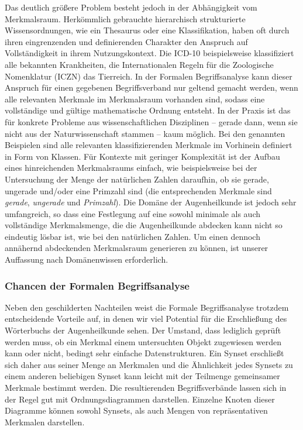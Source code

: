 \documentclass[pagesize,paper=A4,DIV=calc,fontsize=12pt,draft=false]{scrreprt}
\begin{document}
Das deutlich größere Problem besteht jedoch in der Abhängigkeit vom Merkmalsraum. 
Herkömmlich gebrauchte hierarchisch strukturierte Wissensordnungen, wie ein Thesaurus oder eine Klassifikation, haben oft durch ihren eingrenzenden und definierenden Charakter den Anspruch auf Vollständigkeit in ihrem Nutzungskontext. 
Die ICD-10 beispielsweise klassifiziert alle bekannten Krankheiten, die Internationalen Regeln für die Zoologische Nomenklatur (ICZN) das Tierreich. 
In der Formalen Begriffsanalyse kann dieser Anspruch für einen gegebenen Begriffsverband nur geltend gemacht werden, wenn alle relevanten Merkmale im Merkmalsraum vorhanden sind, sodass eine vollständige und gültige mathematische Ordnung entsteht. 
In der Praxis ist das für konkrete Probleme aus wissenschaftlichen Disziplinen -- gerade dann, wenn sie nicht aus der Naturwissenschaft stammen -- kaum möglich. 
Bei den genannten Beispielen sind alle relevanten klassifizierenden Merkmale im Vorhinein definiert in Form von Klassen. 
Für Kontexte mit geringer Komplexität ist der Aufbau eines hinreichenden Merkmalsraums einfach, wie beispielsweise bei der Untersuchung der Menge der natürlichen Zahlen daraufhin, ob sie gerade, ungerade und/oder eine Primzahl sind (die entsprechenden Merkmale sind \textit{gerade}, \textit{ungerade} und \textit{Primzahl}).
Die Domäne der Augenheilkunde ist jedoch sehr umfangreich, so dass eine Festlegung auf eine sowohl minimale als auch vollständige Merkmalsmenge, die die Augenheilkunde abdecken kann nicht so eindeutig lösbar ist, wie bei den natürlichen Zahlen. 
Um einen dennoch annähernd abdeckenden Merkmalsraum generieren zu können, ist unserer Auffassung nach Domänenwissen erforderlich. 

\subsubsection{Chancen der Formalen Begriffsanalyse}

Neben den geschilderten Nachteilen weist die Formale Begriffsanalyse trotzdem entscheidende Vorteile auf, in denen wir viel Potential für die Erschließung des Wörterbuchs der Augenheilkunde sehen. 
Der Umstand, dass lediglich geprüft werden muss, ob ein Merkmal einem untersuchten Objekt zugewiesen werden kann oder nicht, bedingt sehr einfache Datenstrukturen.
Ein Synset erschließt sich daher aus seiner Menge an Merkmalen und die Ähnlichkeit jedes Synsets zu einem anderen beliebigen Synset kann leicht mit der Teilmenge gemeinsamer Merkmale bestimmt werden.
Die resultierenden Begriffsverbände lassen sich in der Regel gut mit Ordnungsdiagrammen darstellen.
Einzelne Knoten dieser Diagramme können sowohl Synsets, als auch Mengen von repräsentativen Merkmalen darstellen. 
\end{document}
